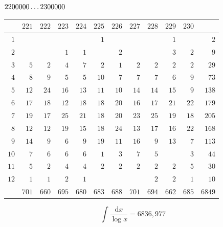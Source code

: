\clearpage
\noindent\begin{minipage}{\linewidth}\centering
{}
\(2200000\mathinner{.\,.\,.}2300000\)\par\smallskip
\begingroup\fontsize{10.5}{11.5}\selectfont\setlength{\tabcolsep}{3.5pt}\renewcommand{\arraystretch}{1}
\begin{tabular}{r|rrrrrrrrrr|r}\hline
 & $221$ & $222$ & $223$ & $224$ & $225$ & $226$ & $227$ & $228$ & $229$ & $230$ &  \\ \hline
$1$ &  &  &  &  & $1$ &  &  &  & $1$ &  & $2$ \\
$2$ &  &  & $1$ & $1$ &  & $2$ &  &  & $3$ & $2$ & $9$ \\
$3$ & $5$ & $2$ & $4$ & $7$ & $2$ & $1$ & $2$ & $2$ & $2$ & $2$ & $29$ \\
$4$ & $8$ & $9$ & $5$ & $5$ & $10$ & $7$ & $7$ & $7$ & $6$ & $9$ & $73$ \\
$5$ & $12$ & $24$ & $16$ & $13$ & $11$ & $10$ & $14$ & $14$ & $15$ & $9$ & $138$ \\
$6$ & $17$ & $18$ & $12$ & $18$ & $18$ & $20$ & $16$ & $17$ & $21$ & $22$ & $179$ \\
$7$ & $19$ & $17$ & $25$ & $21$ & $18$ & $20$ & $23$ & $25$ & $19$ & $18$ & $205$ \\
$8$ & $12$ & $12$ & $19$ & $15$ & $18$ & $24$ & $13$ & $17$ & $16$ & $22$ & $168$ \\
$9$ & $14$ & $9$ & $6$ & $9$ & $19$ & $11$ & $16$ & $9$ & $13$ & $7$ & $113$ \\
$10$ & $7$ & $6$ & $6$ & $6$ & $1$ & $3$ & $7$ & $5$ &  & $3$ & $44$ \\
$11$ & $5$ & $2$ & $4$ & $4$ & $2$ & $2$ & $2$ & $2$ & $2$ & $5$ & $30$ \\
$12$ & $1$ & $1$ & $2$ & $1$ &  &  &  & $2$ & $2$ & $1$ & $10$ \\
\hline
 & $701$ & $660$ & $695$ & $680$ & $683$ & $688$ & $701$ & $694$ & $662$ & $685$ & $6849$ \\ \hline
\end{tabular}\par\endgroup
\setlength{\abovedisplayskip}{6pt}\setlength{\belowdisplayskip}{4pt}
\[\int\frac{\mathrm{d}x}{\log x}=6836{,}977\]
\end{minipage}

